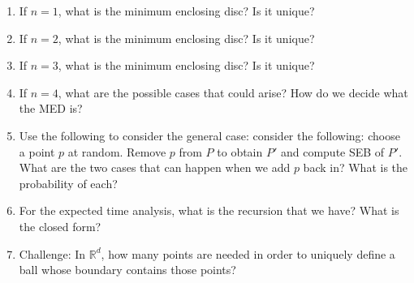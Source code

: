 \documentclass{article}
\def\R{{\mathbb R}}
\begin{document}
\begin{enumerate}
\item If $n=1$, what is the minimum enclosing disc?  Is it unique?
\vspace{3ex}
\item If $n=2$, what is the minimum enclosing disc?  Is it unique?
\vspace{3ex}
\item If $n=3$, what is the minimum enclosing disc?  Is it unique?
\vspace{3ex}
\item If $n=4$, what are the possible cases that could arise?  How do we
decide what the MED is?
\vspace{3ex}
\item Use the following to consider the general case:
consider the following: choose a point $p$ at random.  Remove $p$ from $P$
to obtain $P'$
and compute SEB of $P'$.  What are the two cases that can happen when we
add $p$ back in?  What is the probability of each?
\vspace{3ex}
\item For the expected time analysis, what is the recursion that we have?
What is the closed form?
\vspace{3ex}
\item Challenge: In $\R^d$, how many points are needed in order to uniquely define a
ball whose boundary contains those points?
\vspace{3ex}
\end{enumerate}
\end{document}

